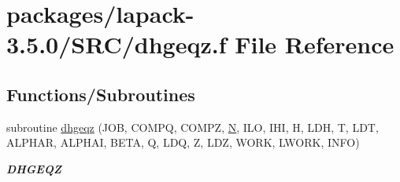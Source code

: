 \hypertarget{dhgeqz_8f}{}\section{packages/lapack-\/3.5.0/\+S\+R\+C/dhgeqz.f File Reference}
\label{dhgeqz_8f}
\subsection*{Functions/\+Subroutines}
\begin{DoxyCompactItemize}
\item 
subroutine \hyperlink{group__doubleGEcomputational_ga21c89aba210fbfb8cca635e47dccbdb3}{dhgeqz} (J\+O\+B, C\+O\+M\+P\+Q, C\+O\+M\+P\+Z, \hyperlink{polmisc_8c_a0240ac851181b84ac374872dc5434ee4}{N}, I\+L\+O, I\+H\+I, H, L\+D\+H, T, L\+D\+T, A\+L\+P\+H\+A\+R, A\+L\+P\+H\+A\+I, B\+E\+T\+A, Q, L\+D\+Q, Z, L\+D\+Z, W\+O\+R\+K, L\+W\+O\+R\+K, I\+N\+F\+O)
\begin{DoxyCompactList}\small\item\em {\bfseries D\+H\+G\+E\+Q\+Z} \end{DoxyCompactList}\end{DoxyCompactItemize}
